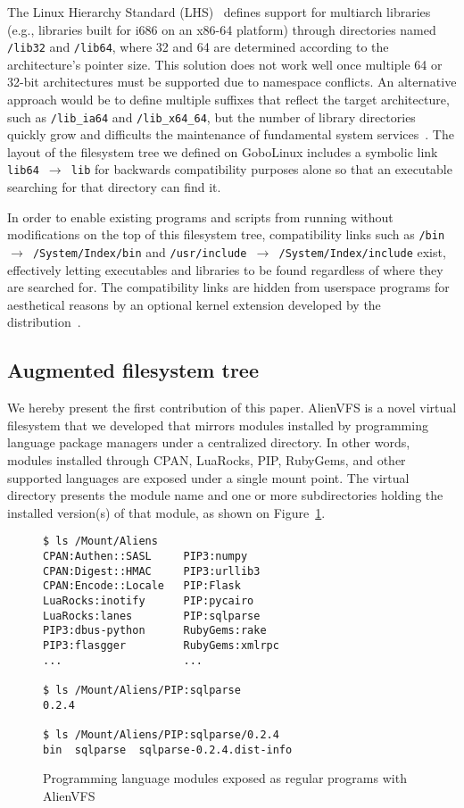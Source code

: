 \documentclass[sigplan, anonymous, 10pt]{acmart}
\begin{document}
The Linux Hierarchy Standard (LHS)~\cite{lsb2015:fhs} defines support for
multiarch libraries (e.g., libraries built for i686 on an x86-64 platform)
through directories named \texttt{/lib32} and \texttt{/lib64},
where 32 and 64 are determined according to the architecture's pointer size.
This solution does not work well once multiple 64 or 32-bit architectures must
be supported due to namespace conflicts. An alternative approach would be to define
multiple suffixes that reflect the target architecture, such as \texttt{/lib\_ia64}
and \texttt{/lib\_x64\_64}, but the number of library directories quickly grow and
difficults the maintenance of fundamental system services~\cite{heen2005:thesis}.
The layout of the filesystem tree we defined on GoboLinux includes a symbolic link
\texttt{lib64 $\rightarrow$ lib} for backwards compatibility purposes alone so that
an executable searching for that directory can find it.

In order to enable existing programs and scripts from running without modifications on
the top of this filesystem tree, compatibility links such as
\texttt{/bin $\rightarrow$ /System/Index/bin} and
\texttt{/usr/include $\rightarrow$ /System/Index/include} exist, effectively letting
executables and libraries to be found regardless of where they are searched for.
The compatibility links are hidden from userspace programs for aesthetical reasons
by an optional kernel extension developed by the distribution~\cite{GoboHide}.

\subsection{Augmented filesystem tree}
We hereby present the first contribution of this paper. AlienVFS is a novel virtual
filesystem that we developed that mirrors modules installed by programming language
package managers under a centralized directory. In other words, modules installed
through CPAN, LuaRocks, PIP, RubyGems, and other supported languages are exposed under
a single mount point. The virtual directory presents the module name and one or more
subdirectories holding the installed version(s) of that module, as shown on
Figure~\ref{fig:alienvfs}.

\begin{figure}
    \begin{Verbatim}[frame=single]
$ ls /Mount/Aliens
CPAN:Authen::SASL     PIP3:numpy
CPAN:Digest::HMAC     PIP3:urllib3
CPAN:Encode::Locale   PIP:Flask
LuaRocks:inotify      PIP:pycairo
LuaRocks:lanes        PIP:sqlparse
PIP3:dbus-python      RubyGems:rake
PIP3:flasgger         RubyGems:xmlrpc
...                   ...

$ ls /Mount/Aliens/PIP:sqlparse
0.2.4

$ ls /Mount/Aliens/PIP:sqlparse/0.2.4
bin  sqlparse  sqlparse-0.2.4.dist-info
    \end{Verbatim}
    \caption{Programming language modules exposed as regular programs with AlienVFS}
    \label{fig:alienvfs}
\end{figure}
\end{document}
